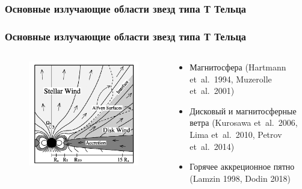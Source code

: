\documentclass{beamer}
\def\etal{{et~al.}}
\begin{document}
\subsubsection{Основные излучающие области звезд типа Т Тельца}
\begin{frame}
\frametitle{Основные излучающие области звезд типа Т Тельца}
\begin{columns}[T]
\begin{column}{0.5\textwidth}
\begin{figure}
\includegraphics[width=\textwidth]{mag.png}
\end{figure}
\end{column}
\begin{column}{0.5\textwidth}
\begin{itemize}
\item Магнитосфера (Hartmann \etal\ 1994, Muzerolle \etal\ 2001)
\item Дисковый и магнитосферные ветра (Kurosawa \etal\ 2006, Lima \etal\ 2010, Petrov \etal\ 2014)
\item Горячее аккреционное пятно (Lamzin 1998, Dodin 2018)
\end{itemize}
\end{column}
\end{columns}
\end{frame}

\end{document}
